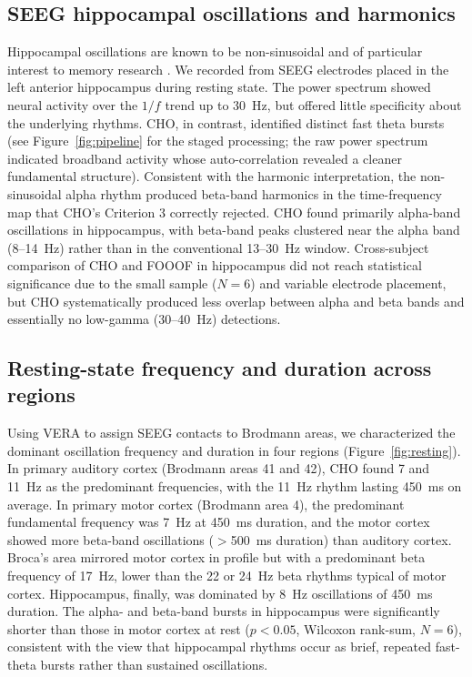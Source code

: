 \documentclass[11pt]{article}
\begin{document}
\subsection{SEEG hippocampal oscillations and harmonics}

Hippocampal oscillations are known to be non-sinusoidal and of particular interest to memory research \citep{belluscio2012crossfrequency}. We recorded from SEEG electrodes placed in the left anterior hippocampus during resting state. The power spectrum showed neural activity over the $1/f$ trend up to 30~Hz, but offered little specificity about the underlying rhythms. CHO, in contrast, identified distinct fast theta bursts (see Figure~\ref{fig:pipeline} for the staged processing; the raw power spectrum indicated broadband activity whose auto-correlation revealed a cleaner fundamental structure). Consistent with the harmonic interpretation, the non-sinusoidal alpha rhythm produced beta-band harmonics in the time-frequency map that CHO's Criterion 3 correctly rejected. CHO found primarily alpha-band oscillations in hippocampus, with beta-band peaks clustered near the alpha band (8--14~Hz) rather than in the conventional 13--30~Hz window. Cross-subject comparison of CHO and FOOOF in hippocampus did not reach statistical significance due to the small sample ($N=6$) and variable electrode placement, but CHO systematically produced less overlap between alpha and beta bands and essentially no low-gamma (30--40~Hz) detections.

\subsection{Resting-state frequency and duration across regions}

Using VERA to assign SEEG contacts to Brodmann areas, we characterized the dominant oscillation frequency and duration in four regions (Figure~\ref{fig:resting}). In primary auditory cortex (Brodmann areas 41 and 42), CHO found 7 and 11~Hz as the predominant frequencies, with the 11~Hz rhythm lasting 450~ms on average. In primary motor cortex (Brodmann area 4), the predominant fundamental frequency was 7~Hz at 450~ms duration, and the motor cortex showed more beta-band oscillations ($>$500~ms duration) than auditory cortex. Broca's area mirrored motor cortex in profile but with a predominant beta frequency of 17~Hz, lower than the 22 or 24~Hz beta rhythms typical of motor cortex. Hippocampus, finally, was dominated by 8~Hz oscillations of 450~ms duration. The alpha- and beta-band bursts in hippocampus were significantly shorter than those in motor cortex at rest ($p < 0.05$, Wilcoxon rank-sum, $N=6$), consistent with the view that hippocampal rhythms occur as brief, repeated fast-theta bursts rather than sustained oscillations.
\end{document}
